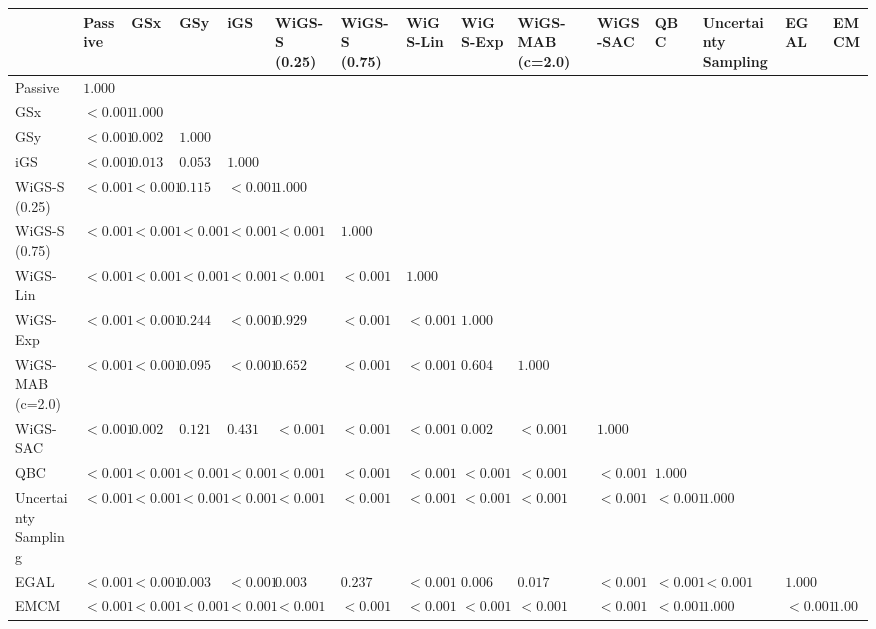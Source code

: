 \begin{tabular}{lllllllllllllll}
\toprule
 & Passive & GSx & GSy & iGS & WiGS-S (0.25) & WiGS-S (0.75) & WiGS-Lin & WiGS-Exp & WiGS-MAB (c=2.0) & WiGS-SAC & QBC & Uncertainty Sampling & EGAL & EMCM \\
\midrule
Passive & $1.000$ &  &  &  &  &  &  &  &  &  &  &  &  &  \\
GSx & $<0.001$ & $1.000$ &  &  &  &  &  &  &  &  &  &  &  &  \\
GSy & $<0.001$ & $0.002$ & $1.000$ &  &  &  &  &  &  &  &  &  &  &  \\
iGS & $<0.001$ & $0.013$ & $0.053$ & $1.000$ &  &  &  &  &  &  &  &  &  &  \\
WiGS-S (0.25) & $<0.001$ & $<0.001$ & $0.115$ & $<0.001$ & $1.000$ &  &  &  &  &  &  &  &  &  \\
WiGS-S (0.75) & $<0.001$ & $<0.001$ & $<0.001$ & $<0.001$ & $<0.001$ & $1.000$ &  &  &  &  &  &  &  &  \\
WiGS-Lin & $<0.001$ & $<0.001$ & $<0.001$ & $<0.001$ & $<0.001$ & $<0.001$ & $1.000$ &  &  &  &  &  &  &  \\
WiGS-Exp & $<0.001$ & $<0.001$ & $0.244$ & $<0.001$ & $0.929$ & $<0.001$ & $<0.001$ & $1.000$ &  &  &  &  &  &  \\
WiGS-MAB (c=2.0) & $<0.001$ & $<0.001$ & $0.095$ & $<0.001$ & $0.652$ & $<0.001$ & $<0.001$ & $0.604$ & $1.000$ &  &  &  &  &  \\
WiGS-SAC & $<0.001$ & $0.002$ & $0.121$ & $0.431$ & $<0.001$ & $<0.001$ & $<0.001$ & $0.002$ & $<0.001$ & $1.000$ &  &  &  &  \\
QBC & $<0.001$ & $<0.001$ & $<0.001$ & $<0.001$ & $<0.001$ & $<0.001$ & $<0.001$ & $<0.001$ & $<0.001$ & $<0.001$ & $1.000$ &  &  &  \\
Uncertainty Sampling & $<0.001$ & $<0.001$ & $<0.001$ & $<0.001$ & $<0.001$ & $<0.001$ & $<0.001$ & $<0.001$ & $<0.001$ & $<0.001$ & $<0.001$ & $1.000$ &  &  \\
EGAL & $<0.001$ & $<0.001$ & $0.003$ & $<0.001$ & $0.003$ & $0.237$ & $<0.001$ & $0.006$ & $0.017$ & $<0.001$ & $<0.001$ & $<0.001$ & $1.000$ &  \\
EMCM & $<0.001$ & $<0.001$ & $<0.001$ & $<0.001$ & $<0.001$ & $<0.001$ & $<0.001$ & $<0.001$ & $<0.001$ & $<0.001$ & $<0.001$ & $1.000$ & $<0.001$ & $1.000$ \\
\bottomrule
\end{tabular}
